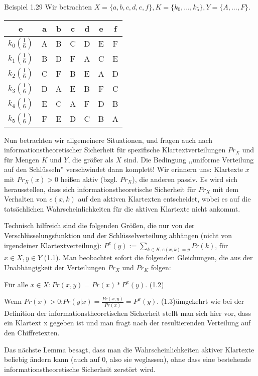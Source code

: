 \documentclass[a4paper]{article}
\begin{document}
\begin{multicols}{3}
    Beispiel 1.29 Wir betrachten $X=\{a,b,c,d,e,f\},K=\{k_0 ,...,k_5\},Y=\{A,...,F\}$.
    \begin{tabular}{c|c|c|c|c|c|c}
    e          & a  & b  & c  & d  & e  & f  \\\hline
    $k_0 (\frac{1}{6})$ & A  & B  & C  & D  & E  & F  \\
    $k_1 (\frac{1}{6})$ & B  & D  & F  & A  & C  & E  \\
    $k_2 (\frac{1}{6})$ & C  & F  & B  & E  & A  & D  \\
    $k_3 (\frac{1}{6})$ & D  & A  & E  & B  & F  & C  \\
    $k_4 (\frac{1}{6})$ & E  & C  & A  & F  & D  & B  \\
    $k_5 (\frac{1}{6})$ & F  & E  & D  & C  & B  & A 
    \end{tabular}

    Nun betrachten wir allgemeinere Situationen, und fragen auch nach informationstheoretischer Sicherheit für spezifische Klartextverteilungen $Pr_X$ und für Mengen $K$ und $Y$, die größer als $X$ sind. Die Bedingung ,,uniforme Verteilung auf den Schlüsseln'' verschwindet dann komplett! Wir erinnern uns: Klartexte $x$ mit $Pr_X(x)> 0$ heißen aktiv (bzgl. $Pr_X$), die anderen passiv. Es wird sich herausstellen, dass sich informationstheoretische Sicherheit für $Pr_X$ mit dem Verhalten von $e(x,k)$ auf den aktiven Klartexten entscheidet, wobei es auf die tatsächlichen Wahrscheinlichkeiten für die aktiven Klartexte nicht ankommt.

    Technisch hilfreich sind die folgenden Größen, die nur von der Verschlüsselungsfunktion und der Schlüsselverteilung abhängen (nicht von irgendeiner Klartextverteilung): $P^x(y):=\sum_{k\in K, e(x,k)=y} Pr(k)$, für $x\in X,y\in Y$ (1.1).
    Man beobachtet sofort die folgenden Gleichungen, die aus der Unabhängigkeit der Verteilungen $Pr_X$ und $Pr_K$ folgen:
    \begin{itemize*}
        \item Für alle $x\in X:Pr(x,y) = Pr(x)*P^x(y)$. (1.2)
        \item Wenn $Pr(x)> 0$:$Pr(y|x) = \frac{Pr(x,y)}{Pr(x)}=P^x(y)$. (1.3)ümgekehrt wie bei der Definition der informationstheoretischen Sicherheit stellt man sich hier vor, dass ein Klartext x gegeben ist und man fragt nach der resultierenden Verteilung auf den Chiffretexten.
    \end{itemize*}
    Das nächste Lemma besagt, dass man die Wahrscheinlichkeiten aktiver Klartexte beliebig ändern kann (auch auf 0, also sie weglassen), ohne dass eine bestehende informationstheoretische Sicherheit zerstört wird.


\end{multicols}
\end{document}

